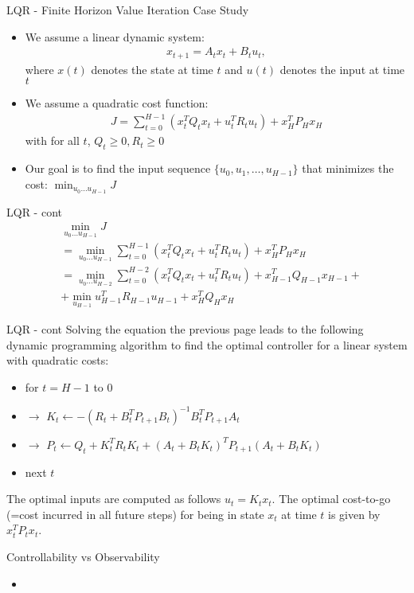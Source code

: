 \documentclass[10pt,mathserif]{beamer}
\begin{document}
\begin{frame}{LQR - Finite Horizon Value Iteration Case Study}
\begin{itemize}
\item We assume a linear dynamic system:
\begin{align}
x_{t+1} = A_tx_t + B_tu_t,
\end{align}
where $x(t)$ denotes the state at time $t$ and $u(t)$ denotes the input at time $t$
\item We assume a quadratic cost function:
\begin{align}
J = \sum_{t=0}^{H-1}(x_t^TQ_tx_t + u_t^TR_tu_t) + x_H^TP_Hx_H
\end{align}
with for all $t$, $Q_t\ge 0, R_t\ge0$
\item Our goal is to find the input sequence $\{u_0, u_1,\dots, u_{H-1}\}$ that minimizes the cost: 
$\min_{u_0\dots u_{H-1}}J$
\end{itemize}
\end{frame}

\begin{frame}{LQR - cont}
\begin{align} \nonumber
&\min_{u_0\dots u_{H-1}}J \\ \nonumber
& = \min_{u_0\dots u_{H-1}} \sum_{t=0}^{H-1}(x_t^TQ_tx_t + u_t^TR_tu_t) + x_H^TP_Hx_H\\ \nonumber
& = \min_{u_0\dots u_{H-2}} \sum_{t=0}^{H-2}(x_t^TQ_tx_t + u_t^TR_tu_t) + x_{H-1}^TQ_{H-1}x_{H-1} + \\ \nonumber
&+\min_{u_{H-1}}u_{H-1}^TR_{H-1}u_{H-1} + x_{H}^TQ_Hx_H \nonumber
\end{align}
\end{frame}

\begin{frame}{LQR - cont}
Solving the equation the previous page leads to the following dynamic programming algorithm to find the optimal
controller for a linear system with quadratic costs:
\begin{itemize}
\item for $t= H-1$ to $0$ 
\item $\rightarrow$ $K_t \leftarrow -(R_t + B_t^TP_{t+1}B_t)^{-1}B_t^TP_{t+1}A_t$ 
\item $\rightarrow$ $P_t \leftarrow Q_t + K_t^TR_tK_t + (A_t + B_tK_t)^TP_{t+1}(A_t + B_tK_t)$
\item next $t$
\end{itemize}
The optimal inputs are computed as follows $u_t=K_tx_t$. The optimal cost-to-go (=cost incurred in all future
steps) for being in state $x_t$ at time $t$ is given by $x_t^TP_tx_t$.
\end{frame}


\begin{frame}{Controllability vs Observability}
\begin{itemize}
\item 
\end{itemize}
\end{frame}
\end{document}
